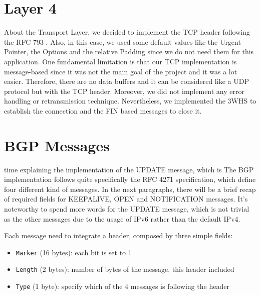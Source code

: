 \section{Layer 4}\label{layer4}
About the Transport Layer, we decided to implement the TCP header following the RFC 793 \cite{rfc793}.
Also, in this case, we used some default values like the Urgent Pointer, the Options and the relative Padding since we do not need them for this application.\newline
One fundamental limitation is that our TCP implementation is message-based since it was not the main goal of the project and it was a lot easier.
Therefore, there are no data buffers and it can be considered like a UDP protocol but with the TCP header.
Moreover, we did not implement any error handling or retransmission technique.\newline
Nevertheless, we implemented the 3WHS to establish the connection and the FIN based messages to close it.

\section{BGP Messages}\label{BGPMex}
time explaining the implementation of the UPDATE message, which is The BGP implementation follows quite specifically the RFC 4271 specification, which define four different kind of messages.
In the next paragraphs, there will be a brief recap of required fields for KEEPALIVE, OPEN and NOTIFICATION messages. It's noteworthy to spend more words for the UPDATE message, which is not trivial as the other messages due to the usage of IPv6 rather than the default IPv4.

Each message need to integrate a header, composed by three simple fields:
\begin{itemize}
    \item \texttt{Marker} (16 bytes): each bit is set to 1
    \item \texttt{Length} (2 bytes): number of bytes of the message, this header included
    \item \texttt{Type} (1 byte): specify which of the 4 messages is following the header
\end{itemize}

